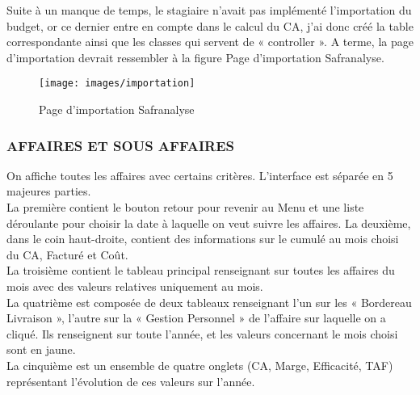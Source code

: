 Suite à un manque de temps, le stagiaire n’avait pas implémenté l’importation du budget, or ce dernier entre en compte dans le calcul du CA, j’ai donc créé la table correspondante ainsi que les classes qui servent de « controller ». A terme, la page d’importation devrait ressembler à la figure Page d’importation Safranalyse.\\

\begin{figure}
\center
\texttt{[image: images/importation]}
\caption{Page d’importation Safranalyse}
\end{figure}

\newpage
\subsubsection{AFFAIRES ET SOUS AFFAIRES}

On affiche toutes les affaires avec certains critères. L’interface est séparée en 5 majeures parties. \\

La première contient le bouton retour pour revenir au Menu et une liste déroulante pour choisir la date à laquelle on veut suivre les affaires. 
La deuxième, dans le coin haut-droite, contient des informations sur le cumulé au mois choisi du CA, Facturé et Coût. \\

La troisième contient le tableau principal renseignant sur toutes les affaires du mois avec des valeurs relatives uniquement au mois. \\

La quatrième est composée de deux tableaux renseignant l’un sur les « Bordereau Livraison », l’autre sur la « Gestion Personnel » de l’affaire sur laquelle on a cliqué. Ils renseignent sur toute l’année, et les valeurs concernant le mois choisi sont en jaune.\\ 

La cinquième est un ensemble de quatre onglets (CA, Marge, Efficacité, TAF) représentant l’évolution de ces valeurs sur l’année.\\

